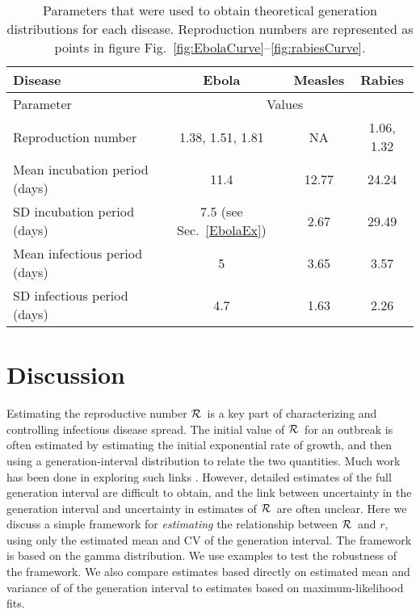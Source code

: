 \documentclass[12pt,]{article}
\newcommand{\RR}{\ensuremath{{\cal R}}}
\newcommand{\sref}[1]{Sec.~\ref{#1}}
\newcommand{\frange}[2]{Fig.~\ref{fig:#1}--\ref{fig:#2}}
\newcommand{\tlab}[1]{\label{tab:#1}}
\begin{document}
\begin{table}[h!]
\centering
\begin{tabular}{l*{3}{c}}
\hline
Disease & Ebola & Measles & Rabies\\
\hline
Parameter & \multicolumn{3}{c}{Values}\\
\hline
Reproduction number & 1.38, 1.51, 1.81 \cite{AylwBarb14} & NA & 1.06, 1.32 \cite{HampDush09} \\
Mean incubation period (days) & 11.4 \cite{AylwBarb14} & 12.77 \cite{LessReic09}  & 24.24 \cite{HampDush09} \\
SD incubation period (days) & 7.5 (see \sref{EbolaEx}) & 2.67 \cite{LessReic09} & 29.49 \cite{HampDush09} \\
Mean infectious period (days) & 5 \cite{AylwBarb14} & 3.65 \cite{Lloy01} & 3.57 \cite{HampDush09} \\
SD infectious period (days) & 4.7 \cite{AylwBarb14} & 1.63 \cite{Lloy01} & 2.26 \cite{HampDush09}
\end{tabular}
\caption{Parameters that were used to obtain theoretical generation distributions for each disease. Reproduction numbers are represented as points in figure \frange{EbolaCurve}{rabiesCurve}.}
\tlab{parameters}
\end{table}

\section{Discussion}

Estimating the reproductive number \RR\ is a key part of characterizing and controlling infectious disease spread. The initial value of \RR\ for an outbreak is often estimated by estimating the initial exponential rate of growth, and then using a generation-interval distribution to relate the two quantities. 
Much work has been done in exploring such links \cite{WallLips07,Sven07,Nish10,Sven15}.
However, detailed estimates of the full generation interval are difficult to obtain, and the link between uncertainty in the generation interval and uncertainty in estimates of \RR\ are often unclear.
Here we discuss a simple framework for \emph{estimating} the relationship between \RR\ and $r$, using only the estimated mean and CV of the generation interval. The framework is based on the gamma distribution. We use examples to test the robustness of the framework. We also compare estimates based directly on estimated mean and variance of of the generation interval to estimates based on maximum-likelihood fits.
\end{document}
